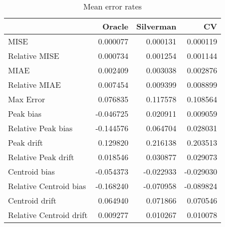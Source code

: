 \begin{table}[H]
\centering
\begin{tabular}{lrrr}
  \hline
 & Oracle & Silverman & CV \\ 
  \hline
MISE & 0.000077 & 0.000131 & 0.000119 \\ 
  Relative MISE & 0.000734 & 0.001254 & 0.001144 \\ 
  MIAE & 0.002409 & 0.003038 & 0.002876 \\ 
  Relative MIAE & 0.007454 & 0.009399 & 0.008899 \\ 
  Max Error & 0.076835 & 0.117578 & 0.108564 \\ 
  Peak bias & -0.046725 & 0.020911 & 0.009059 \\ 
  Relative Peak bias & -0.144576 & 0.064704 & 0.028031 \\ 
  Peak drift & 0.129820 & 0.216138 & 0.203513 \\ 
  Relative Peak drift & 0.018546 & 0.030877 & 0.029073 \\ 
  Centroid bias & -0.054373 & -0.022933 & -0.029030 \\ 
  Relative Centroid bias & -0.168240 & -0.070958 & -0.089824 \\ 
  Centroid drift & 0.064940 & 0.071866 & 0.070546 \\ 
  Relative Centroid drift & 0.009277 & 0.010267 & 0.010078 \\ 
   \hline
\end{tabular}
\caption{Mean error rates} 
\label{tbl:mean_error_rates}
\end{table}
